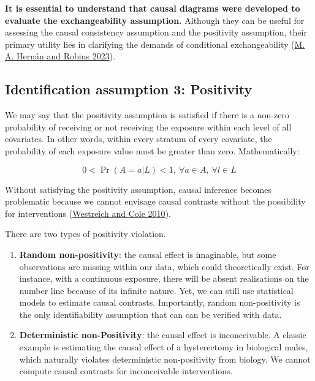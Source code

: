 \documentclass[
  singlecolumn]{report}
\begin{document}
\textbf{It is essential to understand that causal diagrams were
developed to evaluate the exchangeability assumption.} Although they can
be useful for assessing the causal consistency assumption and the
positivity assumption, their primary utility lies in clarifying the
demands of conditional exchangeability
(\protect\hyperlink{ref-hernuxe1n2023a}{M. A. Hernán and Robins 2023}).

\hypertarget{identification-assumption-3-positivity}{%
\subsection{Identification assumption 3:
Positivity}\label{identification-assumption-3-positivity}}

We may say that the positivity assumption is satisfied if there is a
non-zero probability of receiving or not receiving the exposure within
each level of all covariates. In other words, within every stratum of
every covariate, the probability of each exposure value must be greater
than zero. Mathematically:

\[
0 < \Pr(A=a|L)<1, ~ \forall a \in A, ~ \forall l \in L
\]

Without satisfying the positivity assumption, causal inference becomes
problematic because we cannot envisage causal contrasts without the
possibility for interventions
(\protect\hyperlink{ref-westreich2010}{Westreich and Cole 2010}).

There are two types of positivity violation.

\begin{enumerate}
\def\labelenumi{\arabic{enumi}.}
\item
  \textbf{Random non-positivity}: the causal effect is imaginable, but
  some observations are missing within our data, which could
  theoretically exist. For instance, with a continuous exposure, there
  will be absent realisations on the number line because of its infinite
  nature. Yet, we can still use statistical models to estimate causal
  contrasts. Importantly, random non-positivity is the only
  identifiability assumption that can can be verified with data.
\item
  \textbf{Deterministic non-Positivity}: the causal effect is
  inconceivable. A classic example is estimating the causal effect of a
  hysterectomy in biological males, which naturally violates
  deterministic non-positivity from biology. We cannot compute causal
  contrasts for inconceivable interventions.
\end{enumerate}
\end{document}
